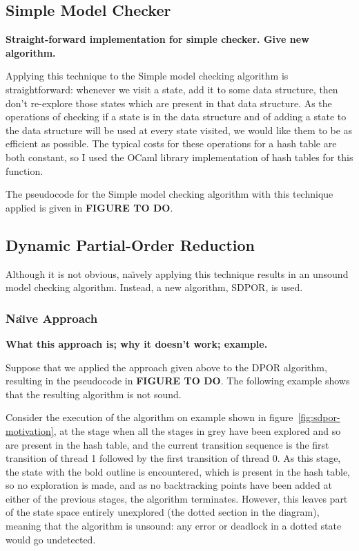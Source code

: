 \documentclass[12pt,a4paper,twoside,openright]{report}
\begin{document}
\subsection{Simple Model Checker}
\textbf{Straight-forward implementation for simple
	checker. Give new algorithm.}

Applying this technique to the Simple model
checking algorithm is straightforward: whenever
we visit a state, add it to some data structure,
then don't re-explore those states which are
present in that data structure. As the operations
of checking if a state is in the data structure
and of adding a state to the data structure will
be used at every state visited, we would like them
to be as efficient as possible. The typical costs
for these operations for a hash table are both
constant, so I used the OCaml library implementation
of hash tables for this function.

The pseudocode for the Simple model checking
algorithm with this technique applied is given
in \textbf{FIGURE TO DO}.

\subsection{Dynamic Partial-Order Reduction}
Although it is not obvious, na\"{\i}vely
applying this technique results in an
unsound model checking algorithm. Instead,
a new algorithm, SDPOR, is used.

\subsubsection{Na\"{\i}ve Approach}
\textbf{What this approach is; why it doesn't
	work; example.}

Suppose that we applied the approach
given above to the DPOR algorithm,
resulting in the pseudocode in \textbf{FIGURE TO DO}.
The following example shows that the resulting
algorithm is not sound.

Consider the execution of the algorithm on example
 shown in figure~\ref{fig:sdpor-motivation},
at the stage when all the stages in grey have been
explored and so are present in the hash table,
and the current transition sequence is the first
transition of thread 1 followed by the first
transition of thread 0. As this stage, the state
with the bold outline is encountered, which is
present in the hash table, so no exploration is
made, and as no backtracking points have been added
at either of the previous stages, the algorithm
terminates. However, this leaves part of the state
space entirely unexplored (the dotted section in
the diagram), meaning that the algorithm is unsound:
any error or deadlock in a dotted state would go
undetected.
\end{document}
